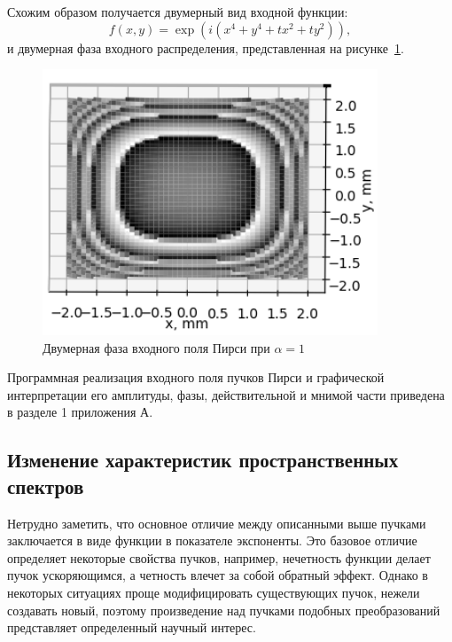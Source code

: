 {{    Схожим образом получается двумерный вид входной функции:
    \begin{equation*}
        f(x, y)  = \exp(i(x^4 + y^4 + tx^2 + ty^2)),
    \end{equation*}
    и двумерная фаза входного распределения, представленная на рисунке~\ref{pearcey_phase_2d}.
    \begin{figure}[H]
        \begin{center}
            \includegraphics[width=10cm]{plots/pearcey_phase_2d_ortho}
            \caption{Двумерная фаза входного поля Пирси при $\alpha  = 1$}
            \label{pearcey_phase_2d}
        \end{center}
    \end{figure}

    Программная реализация входного поля пучков Пирси и графической
    интерпретации его амплитуды, фазы, действительной и мнимой части
    приведена в разделе 1 приложения А.
    }\label{subsec:численное-моделирование-входного-распределения-пучков-пирси}

    \subsection{Изменение характеристик пространственных спектров}{

    \vspace{-0.1cm}
    Нетрудно заметить, что основное отличие между описанными выше пучками заключается в виде функции в показателе экспоненты.
    Это базовое отличие определяет некоторые свойства пучков, например, нечетность функции делает пучок ускоряющимся,
    а четность влечет за собой обратный эффект. Однако в некоторых ситуациях проще модифицировать существующих пучок,
    нежели создавать новый, поэтому произведение над пучками подобных преобразований представляет определенный научный интерес.

}}
